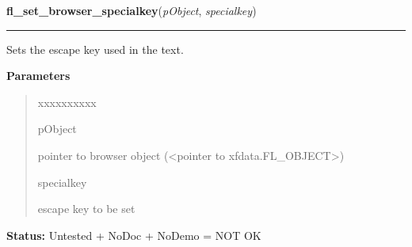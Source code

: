 \hspace{.8\funcindent}\begin{boxedminipage}{\funcwidth}

    \raggedright \textbf{fl\_set\_browser\_specialkey}(\textit{pObject}, \textit{specialkey})

    \vspace{-1.5ex}

    \rule{\textwidth}{0.5\fboxrule}
\setlength{\parskip}{2ex}
    Sets the escape key used in the text.

\setlength{\parskip}{1ex}
      \textbf{Parameters}
      \vspace{-1ex}

      \begin{quote}
        \begin{Ventry}{xxxxxxxxxx}

          \item[pObject]

          pointer to browser object ({\textless}pointer to 
          xfdata.FL\_OBJECT{\textgreater})

          \item[specialkey]

          escape key to be set

        \end{Ventry}

      \end{quote}

\textbf{Status:} Untested + NoDoc + NoDemo = NOT OK



    \end{boxedminipage}

    \label{xformslib:library:fl_set_browser_vscrollbar}

    \vspace{0.5ex}

